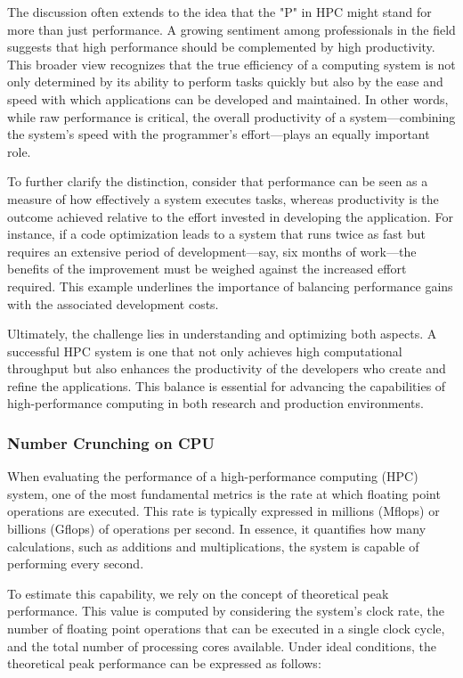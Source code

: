 The discussion often extends to the idea that the "P" in HPC might stand for more than just performance. A growing sentiment among professionals in the field suggests that high performance should be complemented by high productivity. This broader view recognizes that the true efficiency of a computing system is not only determined by its ability to perform tasks quickly but also by the ease and speed with which applications can be developed and maintained. In other words, while raw performance is critical, the overall productivity of a system—combining the system's speed with the programmer's effort—plays an equally important role.

To further clarify the distinction, consider that performance can be seen as a measure of how effectively a system executes tasks, whereas productivity is the outcome achieved relative to the effort invested in developing the application. For instance, if a code optimization leads to a system that runs twice as fast but requires an extensive period of development—say, six months of work—the benefits of the improvement must be weighed against the increased effort required. This example underlines the importance of balancing performance gains with the associated development costs.

Ultimately, the challenge lies in understanding and optimizing both aspects. A successful HPC system is one that not only achieves high computational throughput but also enhances the productivity of the developers who create and refine the applications. This balance is essential for advancing the capabilities of high-performance computing in both research and production environments.

\subsubsection{Number Crunching on CPU} \label{sec:number_crunching}

When evaluating the performance of a high-performance computing (HPC) system, one of the most fundamental metrics is the rate at which floating point operations are executed. This rate is typically expressed in millions (Mflops) or billions (Gflops) of operations per second. In essence, it quantifies how many calculations, such as additions and multiplications, the system is capable of performing every second.

To estimate this capability, we rely on the concept of theoretical peak performance. This value is computed by considering the system’s clock rate, the number of floating point operations that can be executed in a single clock cycle, and the total number of processing cores available. Under ideal conditions, the theoretical peak performance can be expressed as follows:

